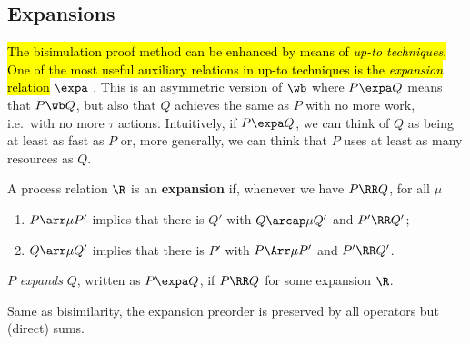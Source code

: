 
\subsection{Expansions}
\label{s:expa}

\hl{The bisimulation proof method can be enhanced by means of \emph{up-to
techniques}. One of the most useful auxiliary relations in up-to
techniques is the \emph{expansion} relation} $\expa$ \cite{arun1992efficiency,sangiorgi2015equations}.
This is an asymmetric version
of $\wb$ where $P \expa Q$ means that $P \wb Q$,
but also that $Q$ achieves the same as $P$
with no more work, i.e.~with no more $\tau$ actions.
Intuitively, if $P \expa Q$, we can think of $Q$ as being
at least as fast as $P$
or, more generally, we can think that $P$ uses at least as many resources as $Q$.
\begin{definition}%
\label{d:expa}
A process relation ${\R}$
  is an \textbf{expansion} if, whenever
we have $P\RR Q$, for all $\mu$
 \begin{enumerate}
 \item   $P \arr\mu P'$ implies that there is $Q'$ with $Q \arcap \mu
   Q'$
  and $P' \RR Q'$;
 \item
     $Q \arr\mu Q'$   implies that there is $P'$ with $P \Arr \mu
  P'$ and $P'
 \RR Q'$.
 \end{enumerate}
  $P$  {\em expands} $Q$, written as
 $P  \expa Q$,
 if $P \RR Q$ for some expansion $\R$.
 \end{definition}

Same as bisimilarity, the expansion preorder is preserved by all operators but (direct) sums.

